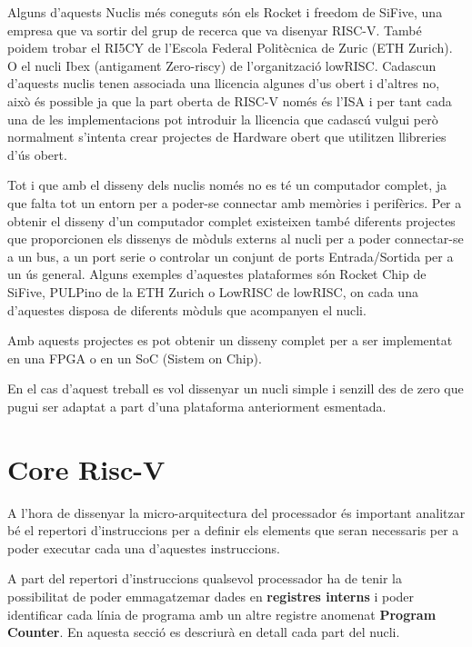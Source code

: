 \documentclass[10pt,a4paper,twocolumn,twoside]{article}
\begin{document}
Alguns d'aquests Nuclis més coneguts són els Rocket i freedom de SiFive, una empresa que va sortir del grup de recerca que va disenyar RISC-V. També poidem trobar el RI5CY de l'Escola Federal Politècnica de Zuric (ETH Zurich). O el nucli Ibex (antigament Zero-riscy) de l'organització lowRISC.
Cadascun d'aquests nuclis tenen associada una llicencia algunes d'us obert i d'altres no, això és possible ja que la part oberta de RISC-V només és l'ISA i per tant cada una de les implementacions pot introduir la llicencia que cadascú vulgui però normalment s'intenta crear projectes de Hardware obert que utilitzen llibreries d'ús obert.

Tot i que amb el disseny dels nuclis només no es té un computador complet, ja que falta tot un entorn per a poder-se connectar amb memòries i perifèrics. Per a obtenir el disseny d'un computador complet existeixen també diferents projectes que proporcionen els dissenys de mòduls externs al nucli per a poder connectar-se a un bus, a un port serie o controlar un conjunt de ports Entrada/Sortida per a un ús general. Alguns exemples d'aquestes plataformes són Rocket Chip de SiFive, PULPino de la ETH Zurich o LowRISC de lowRISC, on cada una d'aquestes disposa de diferents mòduls que acompanyen el nucli.

Amb aquests projectes es pot obtenir un disseny complet per a ser implementat en una FPGA o en un SoC (Sistem on Chip).

En el cas d'aquest treball es vol dissenyar un nucli simple i senzill des de zero que pugui ser adaptat a part d'una plataforma anteriorment esmentada.

\section{Core Risc-V}
A l'hora de dissenyar la micro-arquitectura del processador és important analitzar bé el repertori d'instruccions per a definir els elements que seran necessaris per a poder executar cada una d'aquestes instruccions.

A part del repertori d'instruccions qualsevol processador ha de tenir la possibilitat de poder emmagatzemar dades en \textbf{registres interns} i poder identificar cada línia de programa amb un altre registre anomenat\textbf{ Program Counter}.
En aquesta secció es descriurà en detall cada part del nucli. 
\end{document}
